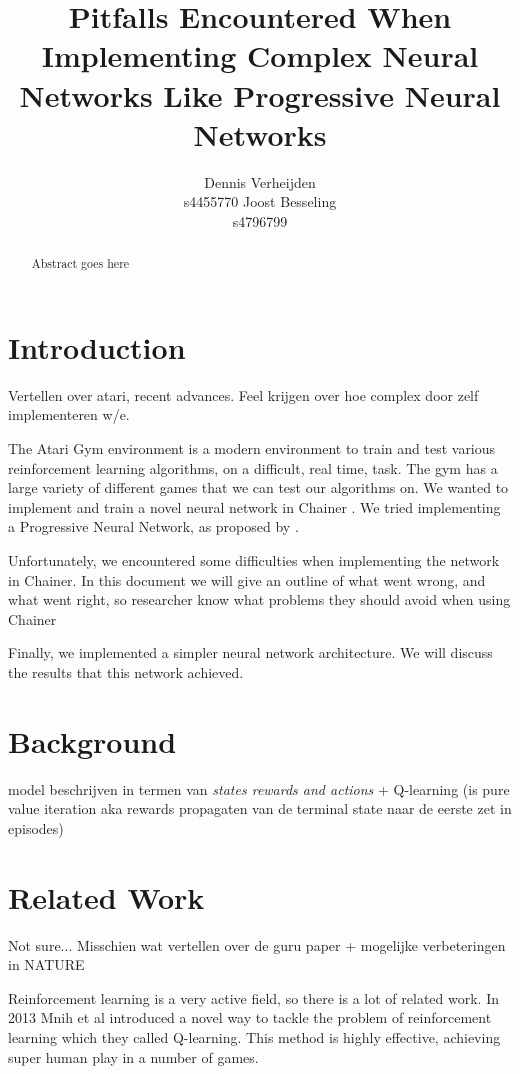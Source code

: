 \documentclass{article}
\title{Pitfalls Encountered When Implementing Complex Neural Networks Like Progressive Neural Networks}
\author{
  Dennis Verheijden\\
  s4455770
  \And
  Joost Besseling\\
  s4796799
}
\begin{document}

\maketitle

\begin{abstract}
  Abstract goes here
\end{abstract}

\section{Introduction}
Vertellen over atari, recent advances. Feel krijgen over hoe complex door zelf implementeren w/e.

The Atari Gym \cite{1606.01540} environment is a modern environment to train and test various reinforcement learning algorithms, on a difficult, real time, task. The gym has a large variety of different games that we can test our algorithms on. We wanted to implement and train a novel neural network in Chainer \cite{chainer_learningsys2015}. We tried implementing a Progressive Neural Network, as proposed by \cite{rusu2016progressive}. 

Unfortunately, we encountered some difficulties when implementing the network in Chainer. In this document we will give an outline of what went wrong, and what went right, so researcher know what problems they should avoid when using Chainer %

Finally, we implemented a simpler neural network architecture. We will discuss the results that this network achieved. 

\section{Background}
model beschrijven in termen van \emph{states rewards and actions} + Q-learning (is pure value iteration aka rewards propagaten van de terminal state naar de eerste zet in episodes)

\section{Related Work}

Not sure... Misschien wat vertellen over de guru paper \cite{mnih2013playing} + mogelijke verbeteringen in NATURE \cite{mnih2015human}

Reinforcement learning is a very active field, so there is a lot of related work. In 2013 Mnih et al introduced a novel way to tackle the problem of reinforcement learning which they called Q-learning. This method is highly effective, achieving super human play in a number of games.
\end{document}

